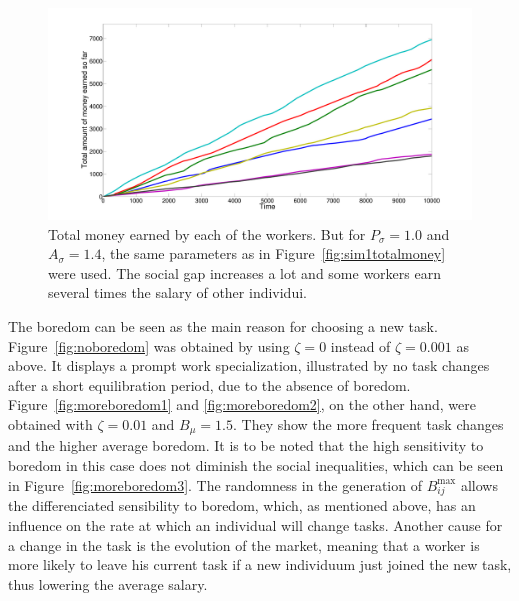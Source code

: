 \begin{figure}[h!]
	\centering
	\includegraphics[width=\textwidth]{../figures/sd2.pdf}
	\caption{Total money earned by each of the workers. But for $P_\sigma=1.0$ and $A_\sigma=1.4$, the same parameters as in Figure~\ref{fig:sim1totalmoney} were used. The social gap increases a lot and some workers earn several times the salary of other individui.}
	\label{fig:sd2}
\end{figure}
The boredom can be seen as the main reason for choosing a new task. Figure~\ref{fig:noboredom} was obtained by using $\zeta=0$ instead of $\zeta=0.001$ as above. It displays a prompt work specialization, illustrated by no task changes after a short equilibration period, due to the absence of boredom. 
Figure~\ref{fig:moreboredom1} and \ref{fig:moreboredom2}, on the other hand, were obtained with $\zeta=0.01$ and $B_\mu=1.5$. They show the more frequent task changes and the higher average boredom. It is to be noted that the high sensitivity to boredom in this case does not diminish the social inequalities, which can be seen in Figure~\ref{fig:moreboredom3}. The randomness in the generation of $B_{ij}^\textrm{max}$ allows the differenciated sensibility to boredom, which, as mentioned above, has an influence on the rate at which an individual will change tasks.
Another cause for a change in the task is the evolution of the market, meaning that a worker is more likely to leave his current task if a new individuum just joined the new task, thus lowering the average salary.

